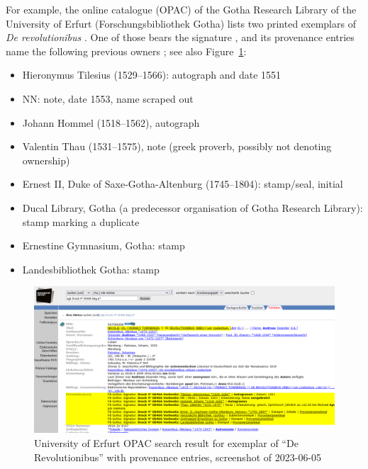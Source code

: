 For example, the online catalogue (OPAC) of the Gotha Research Library of the University of Erfurt (Forschungsbibliothek Gotha) lists two printed exemplars
of \emph{De revolutionibus} \autocite{OPACDeRev}.
One of those bears the signature , and its provenance entries name the following previous owners \autocite{OPACDeRevPPN}; see also Figure~\ref{fig:OPAC_derev_provenance}:
%
\begin{itemize}
  \item
    Hieronymus Tilesius (1529–1566): autograph and date 1551
  \item
    NN: note, date 1553, name scraped out
  \item
    Johann Hommel (1518–1562), autograph
  \item
    Valentin Thau (1531–1575), note (greek proverb, possibly not denoting ownership)
  \item
    Ernest II, Duke of Saxe-Gotha-Altenburg (1745–1804): stamp/seal, initial
  \item
    Ducal Library, Gotha (a predecessor organisation of Gotha Research Library): stamp marking a duplicate
  \item
    Ernestine Gymnasium, Gotha: stamp
  \item
    Landesbibliothek Gotha: stamp
\end{itemize}

\begin{figure}[ht]
  \centering
  \includegraphics[width=\linewidth]{img/opac_derev_prov.png}
  \caption{University of Erfurt OPAC search result for exemplar  of \enquote{De Revolutionibus} with provenance entries, screenshot of 2023-06-05}
  \label{fig:OPAC_derev_provenance}
\end{figure}

